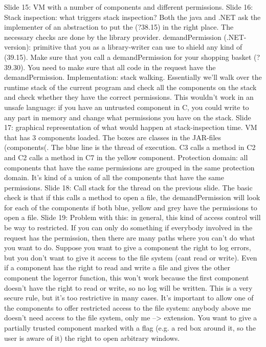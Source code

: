 \documentclass[10pt,a4paper]{report}
\begin{document}
Slide 15: VM with a number of components and different permissions. 
Slide 16: Stack inspection: what triggers stack inspection? Both the java and .NET ask the implementer of an abstraction to put the (?38.15) in the right place. The necessary checks are done by the library provider.
demandPermission (.NET-version): primitive that you as a library-writer can use to shield any kind of (39.15).
Make sure that you call a demandPermission for your shopping basket (?39.30).
You need to make sure that all code in the request have the demandPermission. 
Implementation: stack walking. Essentially we'll walk over the runtime stack of the current program and check all the components on the stack and check whether they have the correct permissions.
This wouldn't work in an unsafe language: if you have an untrusted component in C, you could write to any part in memory and change what permissions you have on the stack. 
Slide 17: graphical representation of what would happen at stack-inspection time. VM that has 3 components loaded. The boxes are classes in the JAR-files (components(. The blue line is the thread of execution. C3 calls a method in C2 and C2 calls a method in C7 in the yellow component.
Protection domain: all components that have the same permissions are grouped in the same protection domain. It's kind of a union of all the components that have the same permissions.
Slide 18: Call stack for the thread on the previous slide. The basic check is that if this calls a method to open a file, the demandPermission will look for each of the components if both blue, yellow and grey have the permissions to open a file. 
Slide 19: Problem with this: in general, this kind of access control will be way to restricted. If you can only do something if everybody involved in the request has the permission, then there are many paths where you can't do what you want to do.
Suppose you want to give a component the right to log errors, but you don't want to give it access to the file system (cant read or write). Even if a component has the right to read and write a file and gives the other component the logerror function, this won't work because the first component doesn't have the right to read or write, so no log will be written.
This is a very secure rule, but it's too restrictive in many cases. It's important to allow one of the components to offer restricted access to the file system: anybody above me doesn't need access to the file system, only me --> extension.
You want to give a partially trusted component marked with a flag (e.g. a red box around it, so the user is aware of it) the right to open arbitrary windows.
\end{document}
